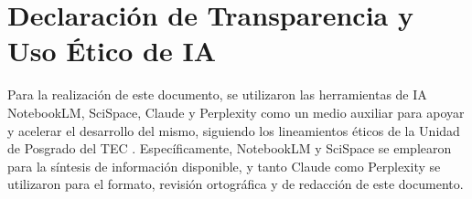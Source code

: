 \section*{Declaraci{\'o}n de Transparencia y Uso {\'E}tico de IA}
Para la realizaci{\'o}n de este documento, se utilizaron las herramientas de IA NotebookLM, SciSpace, Claude y Perplexity como un medio auxiliar para apoyar y acelerar el desarrollo del mismo, siguiendo los lineamientos {\'e}ticos de la Unidad de Posgrado del TEC \cite{tec2025politicasIA}. Espec{\'i}ficamente, NotebookLM y SciSpace se emplearon para la s{\'i}ntesis de informaci{\'o}n disponible, y tanto Claude como Perplexity se utilizaron para el formato, revisi{\'o}n ortogr{\'a}fica y de redacci{\'o}n de este documento.